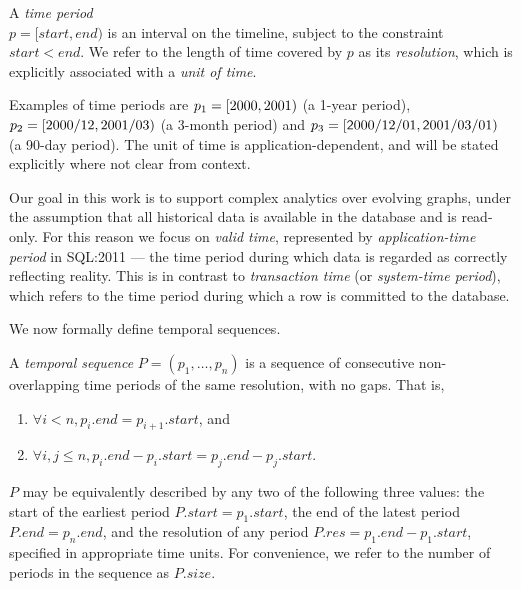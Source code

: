 \begin{definition}
A {\em time period} \\$p = [start, end)$ is an interval on the
  timeline, subject to the constraint $start < end$.  We refer to the
  length of time covered by $p$ as its {\em resolution}, which is
  explicitly associated with a {\em unit of time}.
\label{def:period} 
\end{definition}

Examples of time periods are $p_1=[2000,2001)$ (a 1-year
  period), $p_2=[2000/12,2001/03)$ (a 3-month period)
    and $p_3=[\mathsf 2000/12/01,\mathsf 2001/03/01)$ (a 90-day
      period).  The unit of time is application-dependent, and will be
      stated explicitly where not clear from context.

Our goal in this work is to support complex analytics over evolving
graphs, under the assumption that all historical data is available in
the database and is read-only.  For this reason we focus on {\em valid
  time}, represented by {\em application-time period} in SQL:2011 ---
the time period during which data is regarded as correctly reflecting
reality.  This is in contrast to {\em transaction time} (or {\em
  system-time period}), which refers to the time period during which a
row is committed to the database.

We now formally define temporal sequences.

\begin{definition} 
A {\em temporal sequence} $P = (p_1, \ldots, p_n)$ is a
sequence of consecutive non-overlapping time periods of the same
resolution, with no gaps.  That is,

\begin{enumerate}
\item $\forall i < n, p_i.end = p_{i+1}.start$, and 
\item $\forall i, j \leq n, p_i.end - p_i.start = p_j.end - p_j.start$.
\end{enumerate}
\label{def:tseq} 
\end{definition}

$P$ may be equivalently described by any two of the following three values:
the start of the earliest period $P.start = p_1.start$, the end of the
latest period $P.end = p_n.end$, and the resolution of any period
$P.res = p_1.end - p_1.start$, specified in appropriate time
units. For convenience, we refer to the number of periods in the
sequence as $P.size$.

